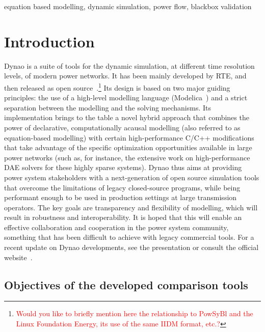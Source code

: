 \documentclass[conference]{IEEEtran}
\newcommand{\Dynawo}{Dyna\textomega o\xspace} %
\begin{document}
\begin{IEEEkeywords}
  equation based modelling, dynamic simulation, power flow, blackbox validation
\end{IEEEkeywords}




\section{Introduction}

\Dynawo\cite{Guironnet18} is a suite of tools for the dynamic simulation, at
different time resolution levels, of modern power networks.  It has been mainly
developed by RTE, and then released as open
source~\cite{Dynawo}.\footnote{\textcolor{red}{Would you like to briefly mention
  here the relationship to PowSyBl and the Linux Foundation Energy, its use of
  the same IIDM format, etc.?}}  Its design is based on two major guiding
principles: the use of a high-level modelling language
(Modelica~\cite{Modelica}) and a strict separation between the modelling and the
solving mechanisms.  Its implementation brings to the table a novel hybrid
approach that combines the power of declarative, computationally acausal
modelling (also referred to as equation-based modelling) with certain
high-performance C/C++ modifications that take advantage of the specific
optimization opportunities available in large power networks (such as, for
instance, the extensive work on high-performance DAE solvers for these highly
sparse systems).  \Dynawo thus aims at providing power system stakeholders with
a next-generation of open source simulation tools that overcome the limitations
of legacy closed-source programs, while being performant enough to be used in
production settings at large transmission operators. The key goals are
transparency and flexibility of modelling, which will result in robustness and
interoperability. It is hoped that this will enable an effective collaboration
and cooperation in the power system community, something that has been difficult
to achieve with legacy commercial tools.  For a recent update on \Dynawo
developments, see the presentation \cite{Guironnet21} or consult the official
website~\cite{Dynawo}.



\subsection{Objectives of the developed comparison tools}
\end{document}
